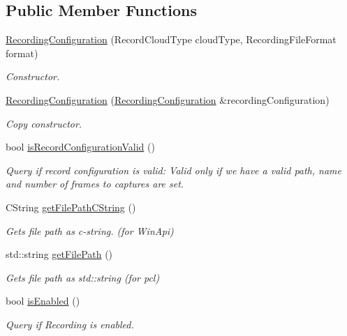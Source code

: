 \subsection*{Public Member Functions}
\begin{DoxyCompactItemize}
\item 
\hyperlink{class_recording_configuration_accc6debf7b8902aab3b79b663dd6114e}{Recording\+Configuration} (Record\+Cloud\+Type cloud\+Type, Recording\+File\+Format format)
\begin{DoxyCompactList}\small\item\em Constructor. \end{DoxyCompactList}\item 
\hyperlink{class_recording_configuration_a9604baeca98377948706b1172dd89136}{Recording\+Configuration} (\hyperlink{class_recording_configuration}{Recording\+Configuration} \&recording\+Configuration)
\begin{DoxyCompactList}\small\item\em Copy constructor. \end{DoxyCompactList}\item 
bool \hyperlink{class_recording_configuration_a9d2e803582ba0bcdb14c32a9cb2648d5}{is\+Record\+Configuration\+Valid} ()
\begin{DoxyCompactList}\small\item\em Query if record configuration is valid\+: Valid only if we have a valid path, name and number of frames to captures are set. \end{DoxyCompactList}\item 
C\+String \hyperlink{class_recording_configuration_a5f3d699c918c51b15a6871dcebd6da82}{get\+File\+Path\+C\+String} ()
\begin{DoxyCompactList}\small\item\em Gets file path as c-\/string. (for Win\+Api) \end{DoxyCompactList}\item 
std\+::string \hyperlink{class_recording_configuration_a2052d5fe0e0de0e34caf44c592eb3d17}{get\+File\+Path} ()
\begin{DoxyCompactList}\small\item\em Gets file path as std\+::string (for pcl) \end{DoxyCompactList}\item 
bool \hyperlink{class_recording_configuration_aebf7ebc2f271917f97762bb696e7d6f2}{is\+Enabled} ()
\begin{DoxyCompactList}\small\item\em Query if Recording is enabled. \end{DoxyCompactList}\item 

\end{DoxyCompactItemize}
